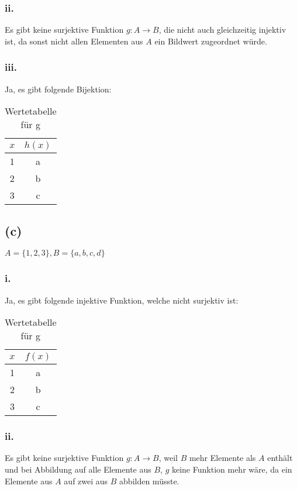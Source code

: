 \documentclass[11pt,a4paper]{article}
\begin{document}
\subsubsection{ii.}
Es gibt keine surjektive Funktion $g : A \rightarrow B$, die nicht auch gleichzeitig injektiv ist, da sonst nicht allen Elementen aus $A$ ein Bildwert zugeordnet würde.

\newpage
\subsubsection{iii.}
Ja, es gibt folgende Bijektion:

\begin{table}[!th]
\begin{tabular}{|c|c|}
\hline
$x$ & $h(x)$\\
\hline
1 & a \\
2 & b \\
3 & c \\
\hline
\end{tabular}
\caption{Wertetabelle für g}
\label{ex:table}
\end{table}


\subsection{(c)}
$A = \{1,2,3\}, B = \{a,b,c,d\}$

\subsubsection{i.}
Ja, es gibt folgende injektive Funktion, welche nicht surjektiv ist:

\begin{table}[!th]
\begin{tabular}{|c|c|}
\hline
$x$ & $f(x)$\\
\hline
1 & a \\
2 & b \\
3 & c \\
\hline
\end{tabular}
\caption{Wertetabelle für g}
\label{ex:table}
\end{table}

\subsubsection{ii.}
Es gibt keine surjektive Funktion $g : A \rightarrow B$, weil $B$ mehr Elemente als $A$ enthält und bei Abbildung auf alle Elemente aus $B$, $g$ keine Funktion mehr wäre, da ein Elemente aus $A$ auf zwei aus $B$ abbilden müsste.
\end{document}
